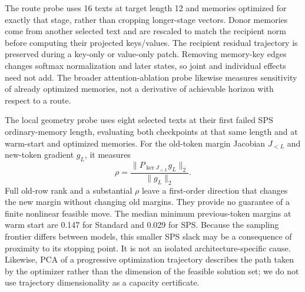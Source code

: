 \begin{table}[htbp]
 \centering
 \small
 \resizebox{\columnwidth}{!}{}
 \caption{Ordinary-memory causal route and donor-patch summaries. Changes are equal-text mean NLL relative to each model's own baseline on targets after the first. Layer indices are one-based. Key and value patches are counterfactual interventions rather than additive information allocations.}
 \label{tab:routes}
\end{table}

\begin{table}[htbp]
 \centering
 \small
 
 \caption{Local restart results at four selected failed SPS ordinary-memory prefixes, without added trainable scalars. FP32 uses the original BF16-quantized weights promoted for arithmetic. Original-regime success requires actual BF16 teacher replay and greedy reconstruction. These are prefix rescues, not full progressive runs.}
 \label{tab:rescue}
\end{table}

The route probe uses 16 texts at target length 12 and memories optimized for exactly that stage, rather than cropping longer-stage vectors.
Donor memories come from another selected text and are rescaled to match the recipient norm before computing their projected keys/values.
The recipient residual trajectory is preserved during a key-only or value-only patch.
Removing memory-key edges changes softmax normalization and later states, so joint and individual effects need not add.
The broader attention-ablation probe likewise measures sensitivity of already optimized memories, not a derivative of achievable horizon with respect to a route.

The local geometry probe uses eight selected texts at their first failed SPS ordinary-memory length, evaluating both checkpoints at that same length and at warm-start and optimized memories.
For the old-token margin Jacobian $J_{<L}$ and new-token gradient $g_L$, it measures
\begin{equation}
 \rho=\frac{\|P_{\ker J_{<L}}g_L\|_2}{\|g_L\|_2}.
\end{equation}
Full old-row rank and a substantial $\rho$ leave a first-order direction that changes the new margin without changing old margins.
They provide no guarantee of a finite nonlinear feasible move.
The median minimum previous-token margins at warm start are 0.147 for Standard and 0.029 for SPS.
Because the sampling frontier differs between models, this smaller SPS slack may be a consequence of proximity to its stopping point.
It is not an isolated architecture-specific cause.
Likewise, PCA of a progressive optimization trajectory describes the path taken by the optimizer rather than the dimension of the feasible solution set; we do not use trajectory dimensionality as a capacity certificate.

